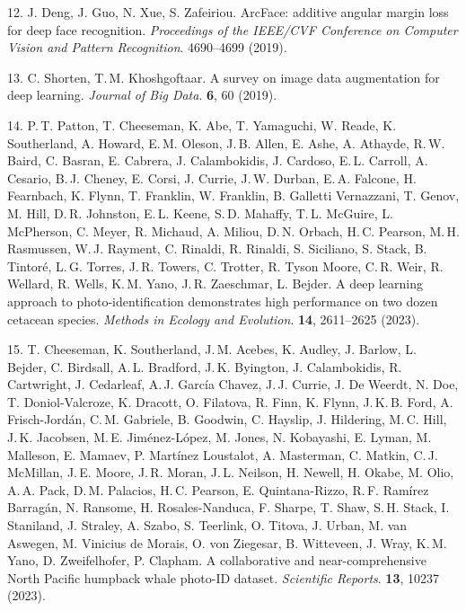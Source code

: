\documentclass[twocolumn]{article}
\begin{document}
12. J. Deng, J. Guo, N. Xue, S. Zafeiriou. ArcFace: additive angular margin loss for deep face recognition. \textit{Proceedings of the IEEE/CVF Conference on Computer Vision and Pattern Recognition}. 4690–4699 (2019).

13. C. Shorten, T.\,M. Khoshgoftaar. A survey on image data augmentation for deep learning. \textit{Journal of Big Data}. \textbf{6}, 60 (2019).

14. P.\,T. Patton, T. Cheeseman, K. Abe, T. Yamaguchi, W. Reade, K. Southerland, A. Howard, E.\,M. Oleson, J.\,B. Allen, E. Ashe, A. Athayde, R.\,W. Baird, C. Basran, E. Cabrera, J. Calambokidis, J. Cardoso, E.\,L. Carroll, A. Cesario, B.\,J. Cheney, E. Corsi, J. Currie, J.\,W. Durban, E.\,A. Falcone, H. Fearnbach, K. Flynn, T. Franklin, W. Franklin, B. Galletti Vernazzani, T. Genov, M. Hill, D.\,R. Johnston, E.\,L. Keene, S.\,D. Mahaffy, T.\,L. McGuire, L. McPherson, C. Meyer, R. Michaud, A. Miliou, D.\,N. Orbach, H.\,C. Pearson, M.\,H. Rasmussen, W.\,J. Rayment, C. Rinaldi, R. Rinaldi, S. Siciliano, S. Stack, B. Tintoré, L.\,G. Torres, J.\,R. Towers, C. Trotter, R. Tyson Moore, C.\,R. Weir, R. Wellard, R. Wells, K.\,M. Yano, J.\,R. Zaeschmar, L. Bejder. A deep learning approach to photo-identification demonstrates high performance on two dozen cetacean species. \textit{Methods in Ecology and Evolution}. \textbf{14}, 2611–2625 (2023).

15. T. Cheeseman, K. Southerland, J.\,M. Acebes, K. Audley, J. Barlow, L. Bejder, C. Birdsall, A.\,L. Bradford, J.\,K. Byington, J. Calambokidis, R. Cartwright, J. Cedarleaf, A.\,J. García Chavez, J.\,J. Currie, J. De Weerdt, N. Doe, T. Doniol-Valcroze, K. Dracott, O. Filatova, R. Finn, K. Flynn, J.\,K.\,B. Ford, A. Frisch-Jordán, C.\,M. Gabriele, B. Goodwin, C. Hayslip, J. Hildering, M.\,C. Hill, J.\,K. Jacobsen, M.\,E. Jiménez-López, M. Jones, N. Kobayashi, E. Lyman, M. Malleson, E. Mamaev, P. Martínez Loustalot, A. Masterman, C. Matkin, C.\,J. McMillan, J.\,E. Moore, J.\,R. Moran, J.\,L. Neilson, H. Newell, H. Okabe, M. Olio, A.\,A. Pack, D.\,M. Palacios, H.\,C. Pearson, E. Quintana-Rizzo, R.\,F. Ramírez Barragán, N. Ransome, H. Rosales-Nanduca, F. Sharpe, T. Shaw, S.\,H. Stack, I. Staniland, J. Straley, A. Szabo, S. Teerlink, O. Titova, J. Urban, M. van Aswegen, M. Vinicius de Morais, O. von Ziegesar, B. Witteveen, J. Wray, K.\,M. Yano, D. Zweifelhofer, P. Clapham. A collaborative and near-comprehensive North Pacific humpback whale photo-ID dataset. \textit{Scientific Reports}. \textbf{13}, 10237 (2023).
\end{document}
